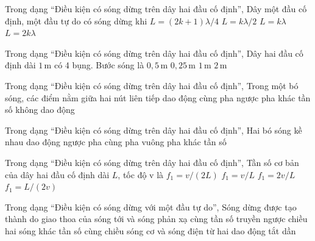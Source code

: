 \begin{ex}
Trong dạng “Điều kiện có sóng dừng trên dây hai đầu cố định”, Dây một đầu cố định, một đầu tự do có sóng dừng khi
\choice
{\True $L=(2k+1)\lambda/4$}
{$L=k\lambda/2$}
{$L=k\lambda$}
{$L=2k\lambda$}
\end{ex}

\begin{ex}
Trong dạng “Điều kiện có sóng dừng trên dây hai đầu cố định”, Dây hai đầu cố định dài $1\,\text{m}$ có 4 bụng. Bước sóng là
\choice
{\True $0,5\,\text{m}$}
{$0,25\,\text{m}$}
{$1\,\text{m}$}
{$2\,\text{m}$}
\end{ex}

\begin{ex}
Trong dạng “Điều kiện có sóng dừng trên dây hai đầu cố định”, Trong một bó sóng, các điểm nằm giữa hai nút liên tiếp dao động
\choice
{\True cùng pha}
{ngược pha}
{khác tần số}
{không dao động}
\end{ex}

\begin{ex}
Trong dạng “Điều kiện có sóng dừng trên dây hai đầu cố định”, Hai bó sóng kề nhau dao động
\choice
{\True ngược pha}
{cùng pha}
{vuông pha}
{khác tần số}
\end{ex}

\begin{ex}
Trong dạng “Điều kiện có sóng dừng trên dây hai đầu cố định”, Tần số cơ bản của dây hai đầu cố định dài $L$, tốc độ v là
\choice
{\True $f_1=v/(2L)$}
{$f_1=v/L$}
{$f_1=2v/L$}
{$f_1=L/(2v)$}
\end{ex}

\begin{ex}
Trong dạng “Điều kiện có sóng dừng với một đầu tự do”, Sóng dừng được tạo thành do giao thoa của
\choice
{\True sóng tới và sóng phản xạ cùng tần số truyền ngược chiều}
{hai sóng khác tần số cùng chiều}
{sóng cơ và sóng điện từ}
{hai dao động tắt dần}
\end{ex}

